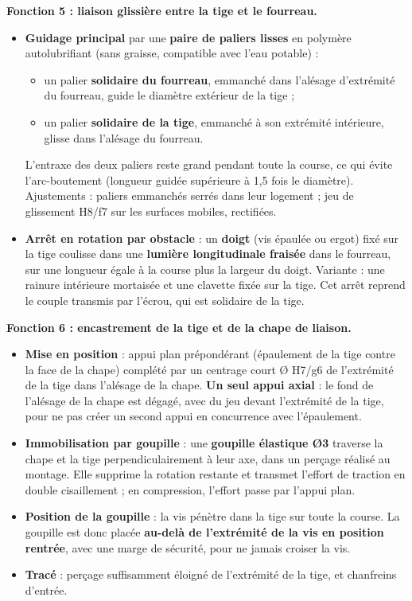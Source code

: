 \documentclass[11pt,a4paper]{article}
\providecommand{\tightlist}{\setlength{\itemsep}{0pt}\setlength{\parskip}{0pt}}
\begin{document}
\textbf{Fonction 5 : liaison glissière entre la tige et le fourreau.}

\begin{itemize}
\tightlist
\item
  \textbf{Guidage principal} par une \textbf{paire de paliers lisses} en polymère autolubrifiant (sans graisse, compatible avec l'eau potable) :

  \begin{itemize}
  \tightlist
  \item
    un palier \textbf{solidaire du fourreau}, emmanché dans l'alésage d'extrémité du fourreau, guide le diamètre extérieur de la tige ;
  \item
    un palier \textbf{solidaire de la tige}, emmanché à son extrémité intérieure, glisse dans l'alésage du fourreau.
  \end{itemize}

  L'entraxe des deux paliers reste grand pendant toute la course, ce qui évite l'arc-boutement (longueur guidée supérieure à 1,5 fois le diamètre). Ajustements : paliers emmanchés serrés dans leur logement ; jeu de glissement H8/f7 sur les surfaces mobiles, rectifiées.
\item
  \textbf{Arrêt en rotation par obstacle} : un \textbf{doigt} (vis épaulée ou ergot) fixé sur la tige coulisse dans une \textbf{lumière longitudinale fraisée} dans le fourreau, sur une longueur égale à la course plus la largeur du doigt. Variante : une rainure intérieure mortaisée et une clavette fixée sur la tige. Cet arrêt reprend le couple transmis par l'écrou, qui est solidaire de la tige.
\end{itemize}

\textbf{Fonction 6 : encastrement de la tige et de la chape de liaison.}

\begin{itemize}
\tightlist
\item
  \textbf{Mise en position} : appui plan prépondérant (épaulement de la tige contre la face de la chape) complété par un centrage court Ø H7/g6 de l'extrémité de la tige dans l'alésage de la chape. \textbf{Un seul appui axial} : le fond de l'alésage de la chape est dégagé, avec du jeu devant l'extrémité de la tige, pour ne pas créer un second appui en concurrence avec l'épaulement.
\item
  \textbf{Immobilisation par goupille} : une \textbf{goupille élastique Ø3} traverse la chape et la tige perpendiculairement à leur axe, dans un perçage réalisé au montage. Elle supprime la rotation restante et transmet l'effort de traction en double cisaillement ; en compression, l'effort passe par l'appui plan.
\item
  \textbf{Position de la goupille} : la vis pénètre dans la tige sur toute la course. La goupille est donc placée \textbf{au-delà de l'extrémité de la vis en position rentrée}, avec une marge de sécurité, pour ne jamais croiser la vis.
\item
  \textbf{Tracé} : perçage suffisamment éloigné de l'extrémité de la tige, et chanfreins d'entrée.
\end{itemize}
\end{document}
